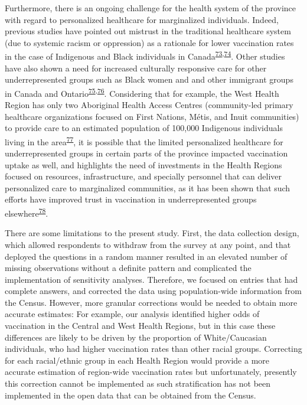 \documentclass[
]{article}
\begin{document}
Furthermore, there is an ongoing challenge for the health system of the
province with regard to personalized healthcare for marginalized
individuals. Indeed, previous studies have pointed out mistrust in the
traditional healthcare system (due to systemic racism or oppression) as
a rationale for lower vaccination rates in the case of Indigenous and
Black individuals in
Canada\textsuperscript{\protect\hyperlink{ref-smylie2022}{73},\protect\hyperlink{ref-eissa2021}{74}}.
Other studies have also shown a need for increased culturally responsive
care for other underrepresented groups such as Black women and and other
immigrant groups in Canada and
Ontario\textsuperscript{\protect\hyperlink{ref-etowa2021}{75},\protect\hyperlink{ref-patel2019}{76}}.
Considering that for example, the West Health Region has only two
Aboriginal Health Access Centres (community-led primary healthcare
organizations focused on First Nations, Métis, and Inuit communities) to
provide care to an estimated population of 100,000 Indigenous
individuals living in the
area\textsuperscript{\protect\hyperlink{ref-ontariohealth}{77}}, it is
possible that the limited personalized healthcare for underrepresented
groups in certain parts of the province impacted vaccination uptake as
well, and highlights the need of investments in the Health Regions
focused on resources, infrastructure, and specially personnel that can
deliver personalized care to marginalized communities, as it has been
shown that such efforts have improved trust in vaccination in
underrepresented groups
elsewhere\textsuperscript{\protect\hyperlink{ref-schafferderoo2020}{78}}.

There are some limitations to the present study. First, the data
collection design, which allowed respondents to withdraw from the survey
at any point, and that deployed the questions in a random manner
resulted in an elevated number of missing observations without a
definite pattern and complicated the implementation of sensitivity
analyses. Therefore, we focused on entries that had complete answers,
and corrected the data using population-wide information from the
Census. However, more granular corrections would be needed to obtain
more accurate estimates: For example, our analysis identified higher
odds of vaccination in the Central and West Health Regions, but in this
case these differences are likely to be driven by the proportion of
White/Caucasian individuals, who had higher vaccination rates than other
racial groups. Correcting for each racial/ethnic group in each Health
Region would provide a more accurate estimation of region-wide
vaccination rates but unfortunately, presently this correction cannot be
implemented as such stratification has not been implemented in the open
data that can be obtained from the Census.
\end{document}
